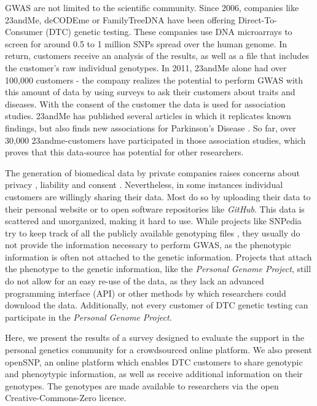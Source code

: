 \documentclass[10pt]{article}
\begin{document}
GWAS are not limited to the scientific community. Since 2006, companies like 23andMe, deCODEme or FamilyTreeDNA have been offering Direct-To-Consumer (DTC) genetic testing. 
These companies use DNA microarrays to screen for around 0.5 to 1 million SNPs spread over the human genome. In return, customers 
receive an analysis of the results, as well as a file that includes the customer's raw individual genotypes. In 2011, 23andMe 
alone had over 100,000 customers \cite{23andMe2011}
- the company realizes the potential to perform GWAS with this amount of data by using surveys to ask their customers about 
traits and diseases. With the consent of the customer the data is used for association studies. 23andMe has published several 
articles in which it replicates known findings, but also finds new associations for Parkinson's Disease \cite{Eriksson2010, Do2011}. 
So far, over 30,000 23andme-customers have participated in those association studies, which proves that this data-source has potential for other researchers.

The generation of biomedical data by private companies raises concerns about privacy \cite{23andMe2012}, 
liability and consent \cite{Caulfield2011}. 
Nevertheless, in some instances individual customers are willingly sharing their data. Most do so by uploading their data to
their personal website or to open software repositories like \textit{GitHub}. 
This data is scattered and unorganized, making it hard to use. While projects like SNPedia try to keep track of all 
the publicly available genotyping files \cite{Cariaso2011}, they usually do not provide the information necessary to perform GWAS, as the phenotypic information is 
often not attached to the genetic information. Projects that attach the phenotype to the genetic information, 
like the \textit{Personal Genome Project}, still do not allow for an easy re-use of the data, as they lack an advanced programming interface (API) 
or other methods by which researchers could download the data. Additionally, not every customer of DTC genetic testing can participate in the \textit{Personal Genome Project}.  

Here, we present the results of a survey designed to evaluate the support in the personal genetics community for a crowdsourced online platform. 
We also present openSNP, an online platform which enables DTC customers to share genotypic and phenoytypic information, as well as receive additional information on their genotypes. 
The genotypes are made available to researchers via the open Creative-Commons-Zero licence.
\end{document}
